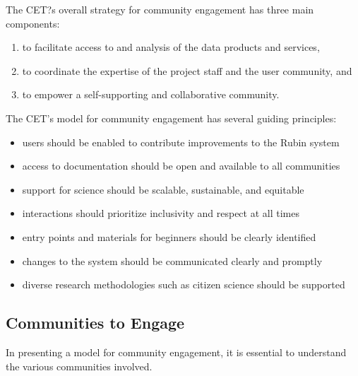 \documentclass[DM,lsstdraft,toc]{lsstdoc}
\begin{document}
The CET?s overall strategy for community engagement has three main components:
\begin{enumerate}
\item to facilitate access to and analysis of the data products and services,
\item to coordinate the expertise of the project staff and the user community, and
\item to empower a self-supporting and collaborative community.
\end{enumerate}

The CET's model for community engagement has several guiding principles:
\begin{itemize}
\item users should be enabled to contribute improvements to the Rubin system
\item access to documentation should be open and available to all communities
\item support for science should be scalable, sustainable, and equitable
\item interactions should prioritize inclusivity and respect at all times
\item entry points and materials for beginners should be clearly identified
\item changes to the system should be communicated clearly and promptly
\item diverse research methodologies such as citizen science should be supported
\end{itemize}


\subsection{Communities to Engage}\label{ssec:intro_comms}

In presenting a model for community engagement, it is essential to understand the various communities involved.
\end{document}
